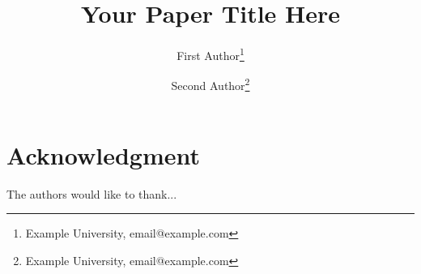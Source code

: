 \documentclass[11pt]{article}
\begin{document}
\title{Your Paper Title Here}

\author{%
  First Author\thanks{Example University, email@example.com} \and
  Second Author\thanks{Example University, email@example.com}
}

\date{} %

\maketitle










\section*{Acknowledgment}
The authors would like to thank...



\end{document}
